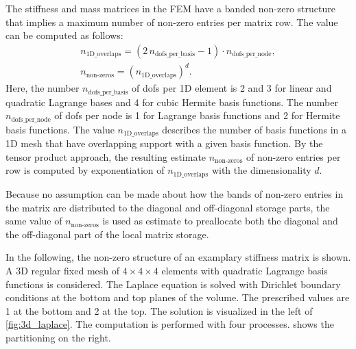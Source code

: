 The stiffness and mass matrices in the FEM have a banded non-zero structure that implies a maximum number of non-zero entries per matrix row. The value can be computed as follows:
\begin{equation}\label{eq:nonzero_estimates}
  \begin{array}{ll}
    n_\text{1D\_overlaps} = (2\,n_\text{dofs\_per\_basis} - 1)\cdot n_\text{dofs\_per\_node},\\[4mm]
    n_\text{non-zeros} = \left(n_\text{1D\_overlaps}\right)^d.
  \end{array}
\end{equation}
Here, the number $n_\text{dofs\_per\_basis}$ of dofs per 1D element is 2 and 3 for linear and quadratic Lagrange bases and 4 for cubic Hermite basis functions. The number $n_\text{dofs\_per\_node}$ of dofs per node is 1 for Lagrange basis functions and 2 for Hermite basis functions. The value $n_\text{1D\_overlaps}$ describes the number of basis functions in a 1D mesh that have overlapping support with a given basis function. By the tensor product approach, the resulting estimate $n_\text{non-zeros}$ of non-zero entries per row is computed by exponentiation of $n_\text{1D\_overlaps}$ with the dimensionality $d$.

Because no assumption can be made about how the bands of non-zero entries in the matrix are distributed to the diagonal and off-diagonal storage parts, the same value of $n_\text{non-zeros}$ is used as estimate to preallocate both the diagonal and the off-diagonal part of the local matrix storage.

In the following, the non-zero structure of an examplary stiffness matrix is shown. A 3D regular fixed mesh of $4\times 4 \times 4$ elements with quadratic Lagrange basis functions is considered. The Laplace equation is solved with Dirichlet boundary conditions at the bottom and top planes of the volume. The prescribed values are 1 at the bottom and 2 at the top. The solution is visualized in the left of \cref{fig:3d_laplace}. The computation is performed with four processes.  shows the partitioning on the right.

